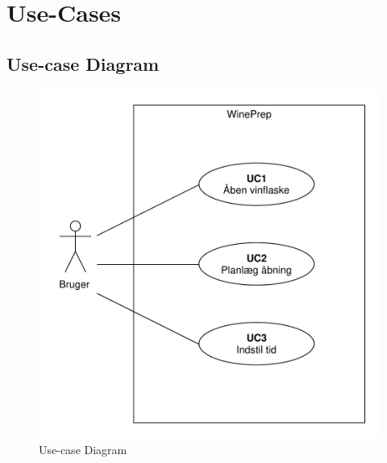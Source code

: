 
\section{Use-Cases}

\subsection{Use-case Diagram}
\begin{figure}[H]
\centering
\includegraphics[scale=0.5]{usecasediagram.pdf}
\caption[Figur]{Use-case Diagram}
\end{figure}
\newpage
